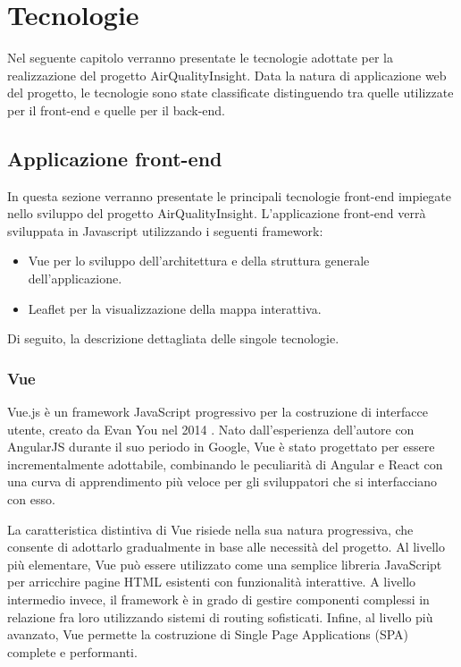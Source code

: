 \clearpage{\pagestyle{empty}\cleardoublepage}
\chapter{Tecnologie}

Nel seguente capitolo verranno presentate le tecnologie adottate per la realizzazione del progetto AirQualityInsight. Data la natura di applicazione web del progetto, le tecnologie sono state classificate distinguendo tra quelle utilizzate per il front-end e quelle per il back-end.

\section{Applicazione front-end}

In questa sezione verranno presentate le principali tecnologie front-end impiegate nello sviluppo del progetto AirQualityInsight.
L'applicazione front-end verrà sviluppata in Javascript utilizzando i seguenti framework:
\begin{itemize}
  \item Vue per lo sviluppo dell'architettura e della struttura generale dell'applicazione.
  \item Leaflet per la visualizzazione della mappa interattiva.
\end{itemize}

Di seguito, la descrizione dettagliata delle singole tecnologie.

\subsection{Vue}

Vue.js è un framework JavaScript progressivo per la costruzione di interfacce utente, creato da Evan You nel 2014 \cite{vue2014}. Nato dall'esperienza dell'autore con AngularJS \cite{angularjs2010} durante il suo periodo in Google, Vue è stato progettato per essere incrementalmente adottabile, combinando le peculiarità di Angular e React \cite{react2013} con una curva di apprendimento più veloce per gli sviluppatori che si interfacciano con esso.

La caratteristica distintiva di Vue risiede nella sua natura progressiva, che consente di adottarlo gradualmente in base alle necessità del progetto. Al livello più elementare, Vue può essere utilizzato come una semplice libreria JavaScript per arricchire pagine HTML esistenti con funzionalità interattive. A livello intermedio invece, il framework è in grado di gestire componenti complessi in relazione fra loro utilizzando sistemi di routing sofisticati. Infine, al livello più avanzato, Vue permette la costruzione di Single Page Applications (SPA) \cite{mdn2024spa} complete e performanti.


